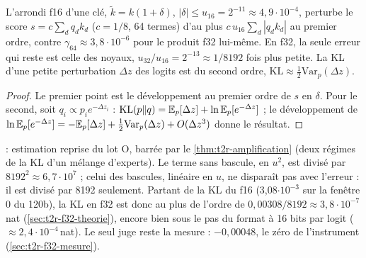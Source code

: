 \begin{proposition}\label{prop:t2n-kv}
L'arrondi f16 d'une clé, $\tilde k = k(1 + \delta)$, $|\delta| \le u_{16} = 2^{-11} \approx 4{,}9\cdot10^{-4}$, perturbe le score $s = c \sum_d q_d k_d$ ($c = 1/8$, 64 termes) d'au plus $c\,u_{16} \sum_d |q_d k_d|$ au premier ordre, contre $\gamma_{64} \approx 3{,}8\cdot10^{-6}$ pour le produit f32 lui-même. En f32, la seule erreur qui reste est celle des noyaux, $u_{32}/u_{16} = 2^{-13} \approx 1/\num{8192}$ fois plus petite. La KL d'une petite perturbation $\Delta z$ des logits est du second ordre, $\mathrm{KL} \approx \tfrac12 \mathrm{Var}_p(\Delta z)$.
\end{proposition}

\begin{proof}
Le premier point est le développement au premier ordre de $s$ en $\delta$. Pour le second, soit $q_i \propto p_i e^{-\Delta z_i}$ : $\mathrm{KL}(p\|q) = \mathbb{E}_p[\Delta z] + \ln \mathbb{E}_p[e^{-\Delta z}]$ ; le développement de $\ln \mathbb{E}_p[e^{-\Delta z}] = -\mathbb{E}_p[\Delta z] + \tfrac12 \mathrm{Var}_p(\Delta z) + O(\Delta z^3)$ donne le résultat.
\end{proof}

 : estimation reprise du lot O, barrée par le \cref{thm:t2r-amplification} (deux régimes de la KL d'un mélange d'experts). Le terme sans bascule, en $u^2$, est divisé par $\num{8192}^2 \approx 6{,}7\cdot10^{7}$ ; celui des bascules, linéaire en $u$, ne disparaît pas avec l'erreur : il est divisé par \num{8192} seulement. Partant de la KL du f16 (3,08$\cdot10^{-3}$ sur la fenêtre 0 du 120b), la KL en f32 est donc au plus de l'ordre de $0{,}00308/\num{8192} \approx 3{,}8\cdot10^{-7}$\,nat \calc{} (\cref{sec:t2r-f32-theorie}), encore bien sous le pas du format à 16 bits par logit ($\approx 2{,}4\cdot10^{-4}$\,nat). Le seul juge reste la mesure : $-0{,}00048$, le zéro de l'instrument (\cref{sec:t2r-f32-mesure}).

